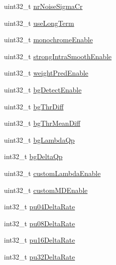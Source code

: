 \begin{DoxyCompactItemize}
\item 
uint32\+\_\+t \mbox{\hyperlink{struct__ni__t408__config__t_a273b9f2be635c0d0531f0f5cb224bc04}{nr\+Noise\+Sigma\+Cr}}
\item 
uint32\+\_\+t \mbox{\hyperlink{struct__ni__t408__config__t_a9260fe23ed9a23a899dc0e57553c8fd0}{use\+Long\+Term}}
\item 
uint32\+\_\+t \mbox{\hyperlink{struct__ni__t408__config__t_a57d235a68d29d3c69f73f59a2337da8f}{monochrome\+Enable}}
\item 
uint32\+\_\+t \mbox{\hyperlink{struct__ni__t408__config__t_a1323fab1abae8075404e760bd25c2e2d}{strong\+Intra\+Smooth\+Enable}}
\item 
uint32\+\_\+t \mbox{\hyperlink{struct__ni__t408__config__t_ab0c6d0beb8986315794f90533523f59d}{weight\+Pred\+Enable}}
\item 
uint32\+\_\+t \mbox{\hyperlink{struct__ni__t408__config__t_a0fc7213a1739d23598670c71e94ac82a}{bg\+Detect\+Enable}}
\item 
uint32\+\_\+t \mbox{\hyperlink{struct__ni__t408__config__t_a7af0e82843279faaad3e89c175665f60}{bg\+Thr\+Diff}}
\item 
uint32\+\_\+t \mbox{\hyperlink{struct__ni__t408__config__t_a823c4e808a39c1e81364083086bf3be7}{bg\+Thr\+Mean\+Diff}}
\item 
uint32\+\_\+t \mbox{\hyperlink{struct__ni__t408__config__t_ad7ac20e9c16bbc44823517ac1aeb8208}{bg\+Lambda\+Qp}}
\item 
int32\+\_\+t \mbox{\hyperlink{struct__ni__t408__config__t_ace278eba9933c8ae9d069285e2b1fb28}{bg\+Delta\+Qp}}
\item 
uint32\+\_\+t \mbox{\hyperlink{struct__ni__t408__config__t_a67b4e8ba87297673867d037c18c83c6a}{custom\+Lambda\+Enable}}
\item 
uint32\+\_\+t \mbox{\hyperlink{struct__ni__t408__config__t_afb4fc1c2a914bf4fbf647767653617c0}{custom\+M\+D\+Enable}}
\item 
int32\+\_\+t \mbox{\hyperlink{struct__ni__t408__config__t_aa7b51ac4288bcb3f1a012985bd910ab7}{pu04\+Delta\+Rate}}
\item 
int32\+\_\+t \mbox{\hyperlink{struct__ni__t408__config__t_abdf9fae442651dc7bbad1c64e3c4a8e8}{pu08\+Delta\+Rate}}
\item 
int32\+\_\+t \mbox{\hyperlink{struct__ni__t408__config__t_adc44d5a2d0598f813ab5e3a9942782fc}{pu16\+Delta\+Rate}}
\item 
int32\+\_\+t \mbox{\hyperlink{struct__ni__t408__config__t_a249307cda533f4b1e8be2b2d42cb702e}{pu32\+Delta\+Rate}}
\item 

\end{DoxyCompactItemize}
